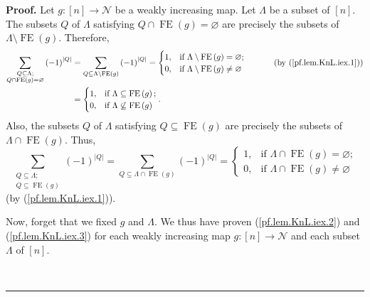 \documentclass[numbers=enddot,12pt,final,onecolumn,notitlepage]{scrartcl}%
\theoremstyle{definition}
\newenvironment{proof}[1][Proof]{\noindent\textbf{#1.} }{\ \rule{0.5em}{0.5em}}
\newenvironment{verlong}{}{}
\let\sumnonlimits\sum
\renewcommand{\sum}{\sumnonlimits\limits}
\begin{document}
\begin{verlong}
\begin{proof}
Let $g:\left[  n\right]  \rightarrow \mathcal{N}$ be a weakly increasing map.
Let $\Lambda$ be a subset of $\left[  n\right]  $. The subsets $Q$ of
$\Lambda$ satisfying $Q\cap\operatorname*{FE}\left(  g\right)  =\varnothing$
are precisely the subsets of $\Lambda\setminus\operatorname*{FE}\left(
g\right)  $. Therefore,
\begin{align}
\sum_{\substack{Q\subseteq\Lambda;\\Q\cap\operatorname*{FE}\left(  g\right)
=\varnothing}}\left(  -1\right)  ^{\left\vert Q\right\vert }  &
=\sum_{Q\subseteq\Lambda\setminus\operatorname*{FE}\left(  g\right)  }\left(
-1\right)  ^{\left\vert Q\right\vert }=%
\begin{cases}
1, & \text{if }\Lambda\setminus\operatorname*{FE}\left(  g\right)
=\varnothing;\\
0, & \text{if }\Lambda\setminus\operatorname*{FE}\left(  g\right)
\neq\varnothing
\end{cases}
\ \ \ \ \ \ \ \ \ \ \left(  \text{by (\ref{pf.lem.KnL.iex.1})}\right)
\nonumber\\
&  =%
\begin{cases}
1, & \text{if }\Lambda\subseteq\operatorname*{FE}\left(  g\right)  ;\\
0, & \text{if }\Lambda\not \subseteq \operatorname*{FE}\left(  g\right)
\end{cases}
. \label{pf.lem.KnL.iex.2}%
\end{align}
Also, the subsets $Q$ of $\Lambda$ satisfying $Q\subseteq\operatorname*{FE}%
\left(  g\right)  $ are precisely the subsets of $\Lambda\cap
\operatorname*{FE}\left(  g\right)  $. Thus,%
\begin{equation}
\sum_{\substack{Q\subseteq\Lambda;\\Q\subseteq\operatorname*{FE}\left(
g\right)  }}\left(  -1\right)  ^{\left\vert Q\right\vert }=\sum_{Q\subseteq
\Lambda\cap\operatorname*{FE}\left(  g\right)  }\left(  -1\right)
^{\left\vert Q\right\vert }=%
\begin{cases}
1, & \text{if }\Lambda\cap\operatorname*{FE}\left(  g\right)  =\varnothing;\\
0, & \text{if }\Lambda\cap\operatorname*{FE}\left(  g\right)  \neq\varnothing
\end{cases}
\label{pf.lem.KnL.iex.3}%
\end{equation}
(by (\ref{pf.lem.KnL.iex.1})).

Now, forget that we fixed $g$ and $\Lambda$. We thus have proven
(\ref{pf.lem.KnL.iex.2}) and (\ref{pf.lem.KnL.iex.3}) for each
weakly increasing map $g:\left[  n\right]  \rightarrow \mathcal{N}$
and each subset $\Lambda$ of $\left[  n\right]  $.


\end{proof}
\end{verlong}
\end{document}
